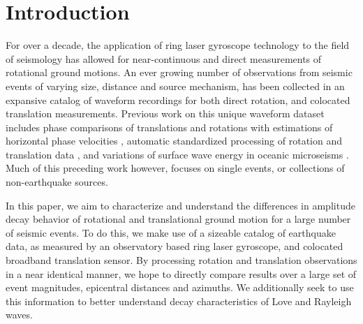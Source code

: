 \documentclass{gji}
\begin{document}
\section{Introduction} 
For over a decade, the application of ring laser gyroscope technology to the field of seismology has allowed for near-continuous and direct measurements of rotational ground motions. An ever growing number of observations from seismic events of varying size, distance and source mechanism, has been collected in an expansive catalog of waveform recordings for both direct rotation, and colocated translation measurements.
Previous work on this unique waveform dataset includes phase comparisons of translations and rotations with estimations of horizontal phase velocities \cite{igel2005rotational},
automatic standardized processing of rotation and translation data \cite{salvermoser2017event}, and
variations of surface wave energy in oceanic microseisms \cite{tanimoto2016seasonal}.
Much of this preceding work however, focuses on single events, or collections of non-earthquake sources.

In this paper, we aim to characterize and understand the differences in amplitude decay behavior of rotational and translational ground motion for a large number of seismic events. To do this, we make use of a sizeable catalog of earthquake data, as measured by an observatory based ring laser gyroscope, and colocated broadband translation sensor. By processing rotation and translation observations in a near identical manner, we hope to directly compare results over a large set of event magnitudes, epicentral distances and  azimuths. We additionally seek to use this information to better understand decay characteristics of Love and Rayleigh waves.
\end{document}
